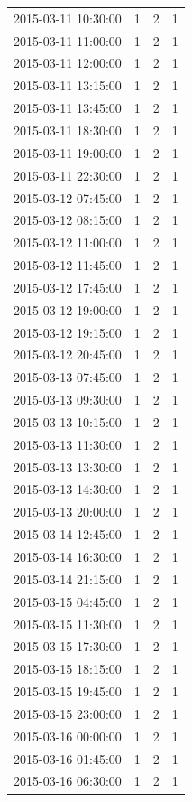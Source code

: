 \begin{tabular}{lrrr}
2015-03-11 10:30:00 & 1 & 2 & 1 \\
2015-03-11 11:00:00 & 1 & 2 & 1 \\
2015-03-11 12:00:00 & 1 & 2 & 1 \\
2015-03-11 13:15:00 & 1 & 2 & 1 \\
2015-03-11 13:45:00 & 1 & 2 & 1 \\
2015-03-11 18:30:00 & 1 & 2 & 1 \\
2015-03-11 19:00:00 & 1 & 2 & 1 \\
2015-03-11 22:30:00 & 1 & 2 & 1 \\
2015-03-12 07:45:00 & 1 & 2 & 1 \\
2015-03-12 08:15:00 & 1 & 2 & 1 \\
2015-03-12 11:00:00 & 1 & 2 & 1 \\
2015-03-12 11:45:00 & 1 & 2 & 1 \\
2015-03-12 17:45:00 & 1 & 2 & 1 \\
2015-03-12 19:00:00 & 1 & 2 & 1 \\
2015-03-12 19:15:00 & 1 & 2 & 1 \\
2015-03-12 20:45:00 & 1 & 2 & 1 \\
2015-03-13 07:45:00 & 1 & 2 & 1 \\
2015-03-13 09:30:00 & 1 & 2 & 1 \\
2015-03-13 10:15:00 & 1 & 2 & 1 \\
2015-03-13 11:30:00 & 1 & 2 & 1 \\
2015-03-13 13:30:00 & 1 & 2 & 1 \\
2015-03-13 14:30:00 & 1 & 2 & 1 \\
2015-03-13 20:00:00 & 1 & 2 & 1 \\
2015-03-14 12:45:00 & 1 & 2 & 1 \\
2015-03-14 16:30:00 & 1 & 2 & 1 \\
2015-03-14 21:15:00 & 1 & 2 & 1 \\
2015-03-15 04:45:00 & 1 & 2 & 1 \\
2015-03-15 11:30:00 & 1 & 2 & 1 \\
2015-03-15 17:30:00 & 1 & 2 & 1 \\
2015-03-15 18:15:00 & 1 & 2 & 1 \\
2015-03-15 19:45:00 & 1 & 2 & 1 \\
2015-03-15 23:00:00 & 1 & 2 & 1 \\
2015-03-16 00:00:00 & 1 & 2 & 1 \\
2015-03-16 01:45:00 & 1 & 2 & 1 \\
2015-03-16 06:30:00 & 1 & 2 & 1 \\

\end{tabular}
